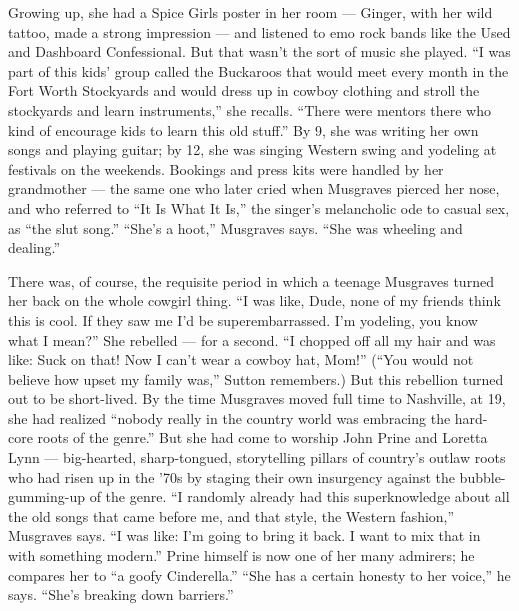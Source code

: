 Growing up, she had a Spice Girls poster in her room --- Ginger, with
her wild tattoo, made a strong impression --- and listened to emo rock
bands like the Used and Dashboard Confessional. But that wasn't the sort
of music she played. ``I was part of this kids' group called the
Buckaroos that would meet every month in the Fort Worth Stockyards and
would dress up in cowboy clothing and stroll the stockyards and learn
instruments,'' she recalls. ``There were mentors there who kind of
encourage kids to learn this old stuff.'' By 9, she was writing her own
songs and playing guitar; by 12, she was singing Western swing and
yodeling at festivals on the weekends. Bookings and press kits were
handled by her grandmother --- the same one who later cried when
Musgraves pierced her nose, and who referred to ``It Is What It Is,''
the singer's melancholic ode to casual sex, as ``the slut song.''
``She's a hoot,'' Musgraves says. ``She was wheeling and dealing.''

There was, of course, the requisite period in which a teenage Musgraves
turned her back on the whole cowgirl thing. ``I was like, Dude, none of
my friends think this is cool. If they saw me I'd be superembarrassed.
I'm yodeling, you know what I mean?'' She rebelled --- for a second. ``I
chopped off all my hair and was like: Suck on that! Now I can't wear a
cowboy hat, Mom!'' (``You would not believe how upset my family was,''
Sutton remembers.) But this rebellion turned out to be short-lived. By
the time Musgraves moved full time to Nashville, at 19, she had realized
``nobody really in the country world was embracing the hard-core roots
of the genre.'' But she had come to worship John Prine and Loretta Lynn
--- big-hearted, sharp-tongued, storytelling pillars of country's outlaw
roots who had risen up in the '70s by staging their own insurgency
against the bubble-gumming-up of the genre. ``I randomly already had
this superknowledge about all the old songs that came before me, and
that style, the Western fashion,'' Musgraves says. ``I was like: I'm
going to bring it back. I want to mix that in with something modern.''
Prine himself is now one of her many admirers; he compares her to ``a
goofy Cinderella.'' ``She has a certain honesty to her voice,'' he says.
``She's breaking down barriers.''

